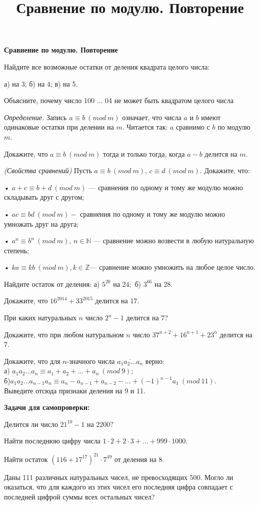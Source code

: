 \centerline{\bf \Huge Сравнение по модулю. Повторение}
\title{ Сравнение по модулю. Повторение}

 Найдите все возможные остатки от деления квадрата целого числа:

а) на 3; б) на 4; в) на 5.

\noindent
Объясните, почему число 100 $\dotsc$ 04 не может быть квадратом целого числа

\noindent\textit{Определение.} Запись $a \equiv b \ (mod \ m)$ означает, что числа $a$ и $b$ имеют одинаковые остатки при делении на $m$. Читается так: $a$ сравнимо с $b$ по модулю $m$.

 Докажите, что $a \equiv b \ (mod \ m)$ тогда и только тогда, когда $a - b$ делится на $m$.

 \textit{(Свойства сравнений)} Пусть $a \equiv b \ (mod \ m)$, $c \equiv d \ (mod \ m)$. Докажите, что:

• $a + c \equiv b + d \ (mod \ m)$ — сравнения по одному и тому же модулю можно складывать друг с другом;

• $ac \equiv bd \ (mod \ m) -$ сравнения по одному и тому же модулю можно умножать друг на друга;

• $a^n \equiv b^n \ (mod \ m)$, $n \in \mathbb{N}$ — сравнение можно возвести в любую натуральную степень;

• $ka \equiv kb \ (mod \ m), k \in \mathbb{Z} $— сравнение можно умножить на любое целое число.

 Найдите остаток от деления: а) $5^{20}$ на $24;$ б) $3^{66}$ на $28.$

 Докажите, что $16^{2014} + 33^{2015}$ делится на $17$.

 При каких натуральных $n$ число $2^n - 1$ делится на $7$?

 Докажите, что при любом натуральном $n$ число ${37}^{n+2} + {16}^{n+1} + {23}^n$ делится на $7$.

 Докажите, что для $n$-значного числа $\overline{a_1a_2\ldots a_n}$ верно:\\
а) $a_1a_2 . . . a_n \equiv a_1 + a_2 + . . . + a_n \ (mod \ 9);$\\
б)$a_1a_2 . . . a_{n-1}a_n \equiv a_n - a_{n-1} + a_{n-2} - . . . + (-1)^{n-1}a_1 \ (mod \ 11).$\\
Выведите отсюда признаки деления на 9 и 11.

\newpage

\textbf{Задачи для самопроверки:}

 Делится ли число $21^{10} - 1$ на $2200?$

 Найти последнюю цифру числа  $1\cdot2 + 2\cdot3 + ... + 999\cdot1000.$

 Найти остаток  $(116 + 17^{17})^{21}·7^{49}$  от деления на 8.

 Даны 111 различных натуральных чисел, не превосходящих 500.
Могло ли оказаться, что для каждого из этих чисел его последняя цифра совпадает с последней цифрой суммы всех остальных чисел?
